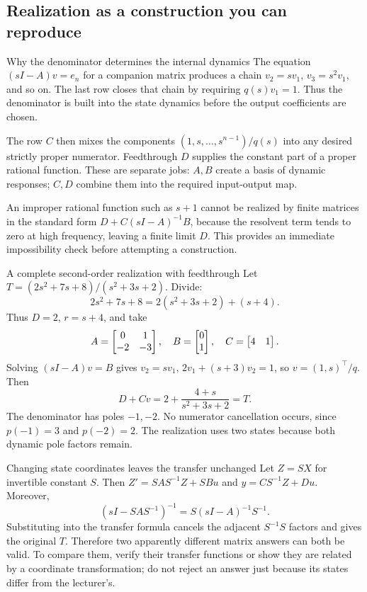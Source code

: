 \subsection{Realization as a construction you can reproduce}
\begin{concept}{Why the denominator determines the internal dynamics}
The equation $(sI-A)v=e_n$ for a companion matrix produces a chain $v_2=sv_1$, $v_3=s^2v_1$, and so on. The last row closes that chain by requiring $q(s)v_1=1$. Thus the denominator is built into the state dynamics before the output coefficients are chosen.

The row $C$ then mixes the components $(1,s,\ldots,s^{n-1})/q(s)$ into any desired strictly proper numerator. Feedthrough $D$ supplies the constant part of a proper rational function. These are separate jobs: $A,B$ create a basis of dynamic responses; $C,D$ combine them into the required input-output map.

An improper rational function such as $s+1$ cannot be realized by finite matrices in the standard form $D+C(sI-A)^{-1}B$, because the resolvent term tends to zero at high frequency, leaving a finite limit $D$. This provides an immediate impossibility check before attempting a construction.
\end{concept}
\begin{worked}{A complete second-order realization with feedthrough}
Let $T=(2s^2+7s+8)/(s^2+3s+2)$. Divide:
\[2s^2+7s+8=2(s^2+3s+2)+(s+4).\]
Thus $D=2$, $r=s+4$, and take
\[A=\begin{bmatrix}0&1\\-2&-3\end{bmatrix},\quad B=\begin{bmatrix}0\\1\end{bmatrix},\quad C=\begin{bmatrix}4&1\end{bmatrix}.\]
Solving $(sI-A)v=B$ gives $v_2=sv_1$, $2v_1+(s+3)v_2=1$, so $v=(1,s)^{\top}/q$. Then
\[D+Cv=2+\frac{4+s}{s^2+3s+2}=T.\]
The denominator has poles $-1,-2$. No numerator cancellation occurs, since $p(-1)=3$ and $p(-2)=2$. The realization uses two states because both dynamic pole factors remain.
\end{worked}
\begin{concept}{Changing state coordinates leaves the transfer unchanged}
Let $Z=SX$ for invertible constant $S$. Then $Z'=SAS^{-1}Z+SBu$ and $y=CS^{-1}Z+Du$. Moreover,
\[(sI-SAS^{-1})^{-1}=S(sI-A)^{-1}S^{-1}.\]
Substituting into the transfer formula cancels the adjacent $S^{-1}S$ factors and gives the original $T$. Therefore two apparently different matrix answers can both be valid. To compare them, verify their transfer functions or show they are related by a coordinate transformation; do not reject an answer just because its states differ from the lecturer's.
\end{concept}
